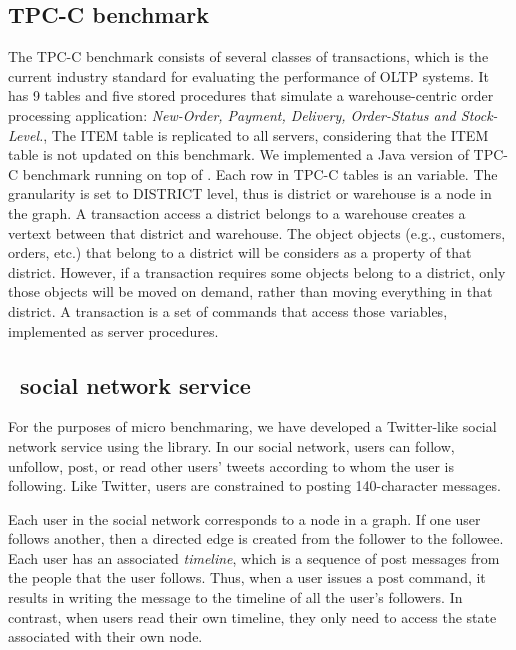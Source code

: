 \subsection{TPC-C benchmark}
\label{sec:imp:tpcc}

The TPC-C benchmark consists of several classes of transactions, which is the 
current industry standard for evaluating the performance of OLTP systems.
It has 9 tables and five stored procedures that simulate a warehouse-centric 
order processing application: \textit{New-Order, Payment, Delivery, Order-Status
and Stock-Level.}, The ITEM table is replicated to
all servers, considering that the ITEM table is not updated on this benchmark.
We implemented a Java version of TPC-C benchmark running on top of \dynastar. 
Each row in TPC-C tables is an variable. The granularity is set to DISTRICT level,
thus is district or warehouse is a node in the graph. A transaction access a district 
belongs to a warehouse creates a vertext between that district and warehouse.
The object objects (e.g., customers, orders, etc.) that belong to a district 
will be considers as a property of that district. However, if a transaction requires
some objects belong to a district, only those objects will be moved on demand, rather than
moving everything in that district.
A transaction is a set of commands that access those variables, implemented 
as server procedures. 

\subsection{\appname\ social network service}
\label{sec:imp:\appname}

For the purposes of micro benchmaring, we have developed a Twitter-like
social network service using the \dynastar{} library.  In our social
network, users can follow, unfollow, post, or read other users' tweets
according to whom the user is following. Like Twitter, users are
constrained to posting 140-character messages.

Each user in the social network corresponds to a node in a graph. If
one user follows another, then a directed edge is created from the
follower to the followee. Each user has an associated \emph{timeline},
which is a sequence of post messages from the people that the user
follows. Thus, when a user issues a post command, it results in
writing the message to the timeline of all the user's followers.  In
contrast, when users read their own timeline, they only need
to access the state associated with their own node.

